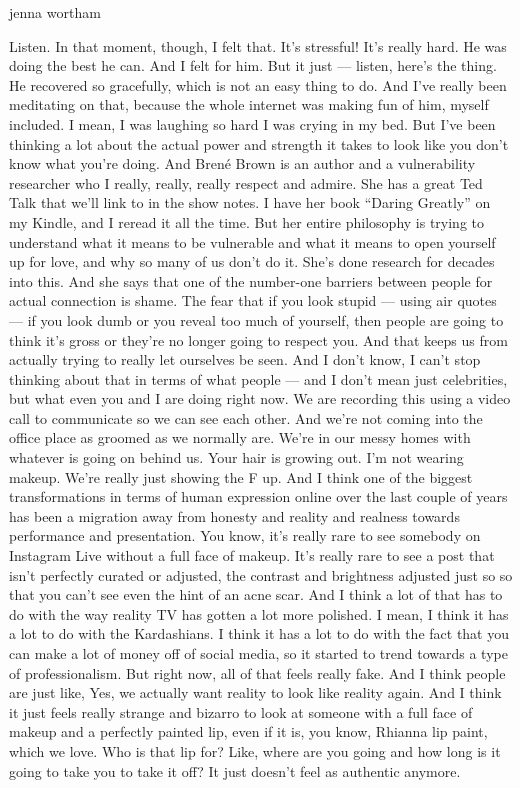 jenna wortham

Listen. In that moment, though, I felt that. It's stressful! It's really
hard. He was doing the best he can. And I felt for him. But it just ---
listen, here's the thing. He recovered so gracefully, which is not an
easy thing to do. And I've really been meditating on that, because the
whole internet was making fun of him, myself included. I mean, I was
laughing so hard I was crying in my bed. But I've been thinking a lot
about the actual power and strength it takes to look like you don't know
what you're doing. And Brené Brown is an author and a vulnerability
researcher who I really, really, really respect and admire. She has a
great Ted Talk that we'll link to in the show notes. I have her book
``Daring Greatly'' on my Kindle, and I reread it all the time. But her
entire philosophy is trying to understand what it means to be vulnerable
and what it means to open yourself up for love, and why so many of us
don't do it. She's done research for decades into this. And she says
that one of the number-one barriers between people for actual connection
is shame. The fear that if you look stupid --- using air quotes --- if
you look dumb or you reveal too much of yourself, then people are going
to think it's gross or they're no longer going to respect you. And that
keeps us from actually trying to really let ourselves be seen. And I
don't know, I can't stop thinking about that in terms of what people ---
and I don't mean just celebrities, but what even you and I are doing
right now. We are recording this using a video call to communicate so we
can see each other. And we're not coming into the office place as
groomed as we normally are. We're in our messy homes with whatever is
going on behind us. Your hair is growing out. I'm not wearing makeup.
We're really just showing the F up. And I think one of the biggest
transformations in terms of human expression online over the last couple
of years has been a migration away from honesty and reality and realness
towards performance and presentation. You know, it's really rare to see
somebody on Instagram Live without a full face of makeup. It's really
rare to see a post that isn't perfectly curated or adjusted, the
contrast and brightness adjusted just so so that you can't see even the
hint of an acne scar. And I think a lot of that has to do with the way
reality TV has gotten a lot more polished. I mean, I think it has a lot
to do with the Kardashians. I think it has a lot to do with the fact
that you can make a lot of money off of social media, so it started to
trend towards a type of professionalism. But right now, all of that
feels really fake. And I think people are just like, Yes, we actually
want reality to look like reality again. And I think it just feels
really strange and bizarro to look at someone with a full face of makeup
and a perfectly painted lip, even if it is, you know, Rhianna lip paint,
which we love. Who is that lip for? Like, where are you going and how
long is it going to take you to take it off? It just doesn't feel as
authentic anymore.

